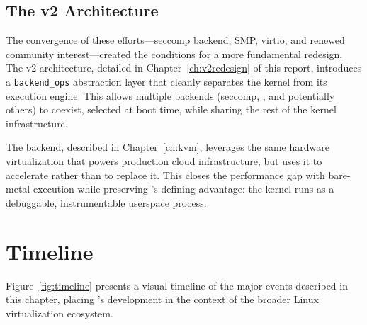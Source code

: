 \subsection{The v2 Architecture}
\label{sec:history-v2}

The convergence of these efforts---seccomp backend, SMP, virtio, and renewed
community interest---created the conditions for a more fundamental redesign.
The v2 architecture, detailed in Chapter~\ref{ch:v2redesign} of this report,
introduces a \texttt{backend\_ops} abstraction layer that cleanly separates
the \UML{} kernel from its execution engine.  This allows multiple backends
(seccomp, \KVMvTwo{}, and potentially others) to coexist, selected at boot
time, while sharing the rest of the kernel infrastructure.

The \KVMvTwo{} backend, described in Chapter~\ref{ch:kvm}, leverages
the same \KVM{} hardware virtualization that powers production cloud
infrastructure, but uses it to accelerate \UML{} rather than to replace it.
This closes the performance gap with bare-metal execution while preserving
\UML{}'s defining advantage: the kernel runs as a debuggable, instrumentable
userspace process.

\section{Timeline}
\label{sec:history-timeline-fig}

Figure~\ref{fig:timeline} presents a visual timeline of the major events
described in this chapter, placing \UML{}'s development in the context of
the broader Linux virtualization ecosystem.

